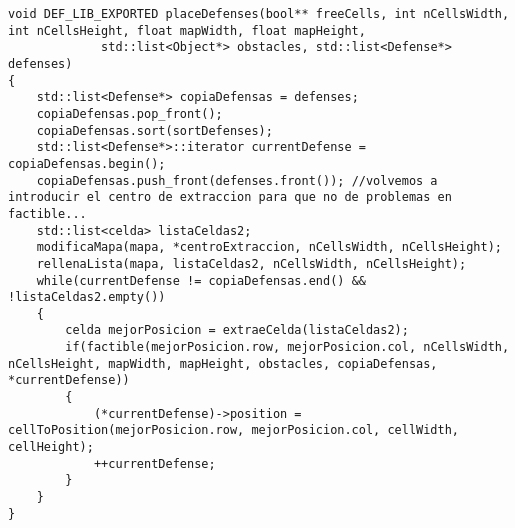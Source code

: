 \begin{lstlisting}
void DEF_LIB_EXPORTED placeDefenses(bool** freeCells, int nCellsWidth, int nCellsHeight, float mapWidth, float mapHeight,
             std::list<Object*> obstacles, std::list<Defense*> defenses) 
{
    std::list<Defense*> copiaDefensas = defenses;
    copiaDefensas.pop_front();
    copiaDefensas.sort(sortDefenses);
    std::list<Defense*>::iterator currentDefense = copiaDefensas.begin();
    copiaDefensas.push_front(defenses.front()); //volvemos a introducir el centro de extraccion para que no de problemas en factible...
    std::list<celda> listaCeldas2; 
    modificaMapa(mapa, *centroExtraccion, nCellsWidth, nCellsHeight);
    rellenaLista(mapa, listaCeldas2, nCellsWidth, nCellsHeight);
    while(currentDefense != copiaDefensas.end() && !listaCeldas2.empty()) 
    {
        celda mejorPosicion = extraeCelda(listaCeldas2);
        if(factible(mejorPosicion.row, mejorPosicion.col, nCellsWidth, nCellsHeight, mapWidth, mapHeight, obstacles, copiaDefensas, *currentDefense))
        {
            (*currentDefense)->position = cellToPosition(mejorPosicion.row, mejorPosicion.col, cellWidth, cellHeight);
            ++currentDefense;
        }
    }
}
\end{lstlisting}

